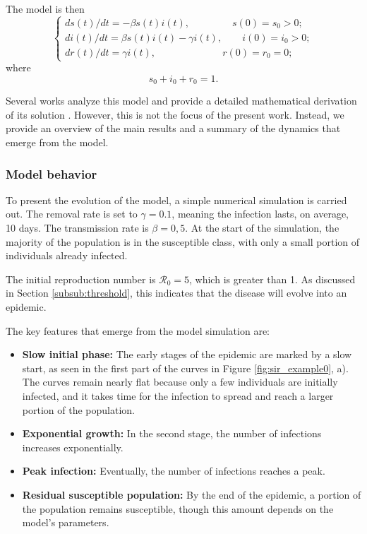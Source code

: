 The model is then
\begin{equation}
	\begin{cases}
		ds(t) / dt = -\beta s(t) i(t), \;\qquad \qquad s(0) = s_0 >0;\\
		di(t) / dt =  \beta s(t) i(t) - \gamma i(t), \qquad i(0) = i_0 > 0;\\
		dr(t) / dt =  \gamma i(t), \qquad \; \, \;\quad \quad \qquad r(0) = r_0 = 0;
	\end{cases}
\end{equation}
where
\begin{equation}
s_0 + i_0 + r_0 = 1.
\end{equation}

Several works analyze this model and provide a detailed mathematical derivation of its solution \cite{diekmann2000mathematical,akinboro2014numerical,Turkyilmazoglu_2021}. However, this is not the focus of the present work. Instead, we provide an overview of the main results and a summary of the dynamics that emerge from the model.

\subsubsection{Model behavior}

To present the evolution of the model, a simple numerical simulation is carried out. The removal rate is set to $\gamma = 0.1$, meaning the infection lasts, on average, 10 days. The transmission rate is $\beta = 0,5$. At the start of the simulation, the majority of the population is in the susceptible class, with only a small portion of individuals already infected.

The initial reproduction number is  $\mathcal{R}_0 = 5$, which is greater than 1. As discussed in Section \ref{subsub:threshold}, this indicates that the disease will evolve into an epidemic.

The key features that emerge from the model simulation are:

\begin{itemize}
	\item \textbf{Slow initial phase:} The early stages of the epidemic are marked by a slow start, as seen in the first part of the curves in Figure \ref{fig:sir_example0}, a). The curves remain nearly flat because only a few individuals are initially infected, and it takes time for the infection to spread and reach a larger portion of the population.
	\item \textbf{Exponential growth:} In the second stage, the number of infections increases exponentially.
	\item \textbf{Peak infection:} Eventually, the number of infections reaches a peak.
	\item \textbf{Residual susceptible population:} By the end of the epidemic, a portion of the population remains susceptible, though this amount depends on the model's parameters.
\end{itemize}


